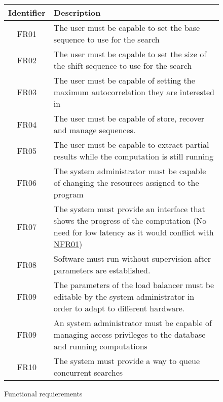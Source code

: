 \begin{figure}[ht!]
  \begin{center}
    \begin{tabular}{||c | p{12cm}||}
      \hline
      Identifier & Description \\
      \hline
      \hline
      FR01 \label{FR01} & The user must be capable to set the base
      sequence to use for the search \\
      \hline
      FR02 \label{FR02} & The user must be capable to set the size
      of the shift sequence to use for the search\\
      \hline
      FR03 \label{FR03} & The user must be capable of setting the maximum
      autocorrelation they are interested in \\
      \hline
       FR04 \label{FR04new} & The user must be capable of store, recover and manage sequences.\\
      \hline
      FR05 \label{FR04} & The user must be capable to extract partial
      results while the computation is still running \\
      \hline
      FR06 \label{FR05} & The system administrator must be capable of changing
      the resources assigned to the program\\
      \hline
      FR07 \label{FR06} & The system must provide an interface that shows
      the progress of the computation (No need for low latency
      as it would conflict with \hyperref[NFR01]{NFR01})\\
      \hline
      FR08 \label{FR07} & Software must
      run without supervision  after parameters are established. \\
      \hline
      FR09 \label{FR08} & The parameters of the load balancer must be editable
      by the system administrator in order to adapt to different hardware.
      \\
      \hline
      FR09 \label{FR09} & An system administrator must be capable of managing
      access privileges to the database and running computations\\
      \hline
      FR10 \label{FR10} & The system must provide a way to queue concurrent
      searches \\
      \hline
    \end{tabular}
  \end{center}

  \caption{Functional requierements}
  \label{functional:fig}
\end{figure}

